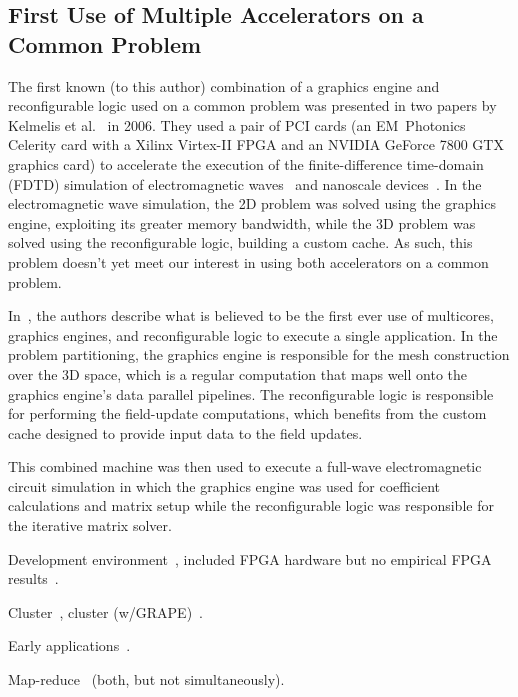 \subsection{First Use of Multiple Accelerators on a Common Problem}

The first known (to this author) combination of a graphics engine and
reconfigurable logic used on a common problem was presented
in two papers
by Kelmelis et al.~\cite{khdo06,kdh+06} in 2006.  They used a pair of PCI cards
(an EM~Photonics Celerity card with a Xilinx Virtex-II FPGA and
an NVIDIA GeForce 7800 GTX graphics card) to accelerate the execution of
the finite-difference time-domain (FDTD) simulation of electromagnetic
waves~\cite{khdo06} and nanoscale devices~\cite{kdh+06}.
In the electromagnetic wave simulation, the 2D problem was solved using
the graphics engine, exploiting its greater memory bandwidth, while the 3D
problem was solved using the reconfigurable logic, building a custom cache.
As such, this problem doesn't yet meet our interest in using both
accelerators on a common problem.

In~\cite{kdh+06}, the authors describe what is believed to be the first
ever use of multicores, graphics engines, and reconfigurable logic to execute
a single application.  In the problem partitioning, the graphics engine is
responsible for the mesh construction over the 3D space, which is a regular
computation that maps well onto the graphics engine's data parallel pipelines.
The reconfigurable logic is responsible for performing the field-update
computations, which benefits from the custom cache designed to provide input
data to the field updates.

This combined machine was then used to execute a full-wave electromagnetic
circuit simulation in which the graphics engine was used for coefficient
calculations and matrix setup while the reconfigurable logic was responsible
for the iterative matrix solver.

Development environment~\cite{cft+10},
included FPGA hardware but no empirical FPGA results~\cite{dy08}.

Cluster~\cite{tl10}, cluster (w/GRAPE)~\cite{sbm+09}.

Early applications~\cite{bkdb10,khdo06,shsc08,tl10}.

Map-reduce~\cite{ytt+08} (both, but not simultaneously).

